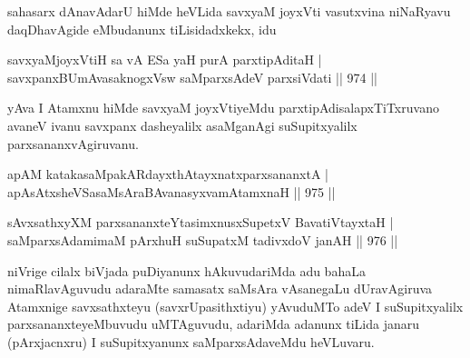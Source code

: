 \begin{artha}
sahasarx dAnavAdarU hiMde heVLida savxyaM joyxVti vasutxvina niNaRyavu daqDhavAgide eMbudanunx tiLisidadxkekx, idu
\end{artha}


\begin{shl}
savxyaMjoyxVtiH sa vA ESa yaH purA parxtipAditaH | \\
savxpanxBUmAvasaknogxV\s sw \footnotemark[1]saMparxsAdeV parxsiVdati \hfill||  974 ||  
\end{shl}

\begin{artha}
yAva I Atamxnu hiMde savxyaM joyxVtiyeMdu parxtipAdisalapxTiTxruvano avaneV ivanu savxpanx dasheyalilx asaMganAgi suSupitxyalilx parxsananxvAgiruvanu.
\end{artha}


\begin{shl}
apAM \footnotemark[2]katakasaMpakARdayxthA\s tayxnatxparxsananxtA | \\
apAsAtxsheVSasaMsAraBAvanasyxvamAtamxnaH \hfill||  975 ||  
\end{shl}
				
\begin{shl}
sAvxsathxyXM parxsananxteYtasimxnusxSupetxV BavatiVtayxtaH | \\
saMparxsAdamimaM pArxhuH suSupatxM tadivxdoV janAH \hfill||  976 ||  
\end{shl}

\begin{artha}
niVrige cilalx biVjada puDiyanunx hAkuvudariMda adu bahaLa nimaRlavAguvudu adaraMte samasatx saMsAra vAsanegaLu dUravAgiruva Atamxnige savxsathxteyu (savxrUpasithxtiyu) yAvuduMTo adeV I suSupitxyalilx parxsananxteyeMbuvudu uMTAguvudu, adariMda adanunx tiLida janaru (pArxjacnxru) I suSupitxyanunx saMparxsAdaveMdu heVLuvaru.
\end{artha}

